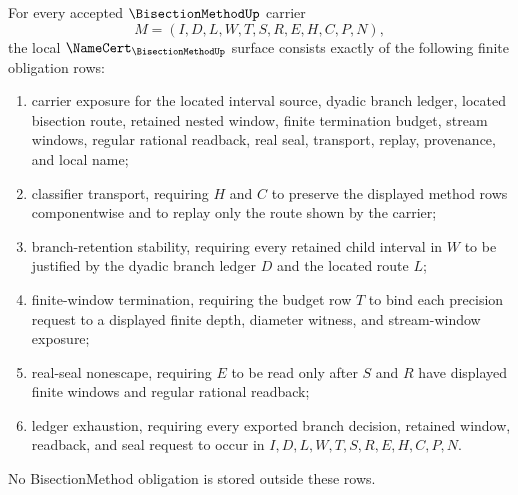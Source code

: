 \begin{theorem}
\label{thm:bisection-method-namecert-obligations}
For every accepted $\BisectionMethodUp$ carrier
$$
M=(I,D,L,W,T,S,R,E,H,C,P,N),
$$
the local $\NameCert_{\BisectionMethodUp}$ surface consists exactly of the following finite obligation rows:
\begin{enumerate}
\item carrier exposure for the located interval source, dyadic branch ledger, located bisection route, retained nested window, finite termination budget, stream windows, regular rational readback, real seal, transport, replay, provenance, and local name;
\item classifier transport, requiring $H$ and $C$ to preserve the displayed method rows componentwise and to replay only the route shown by the carrier;
\item branch-retention stability, requiring every retained child interval in $W$ to be justified by the dyadic branch ledger $D$ and the located route $L$;
\item finite-window termination, requiring the budget row $T$ to bind each precision request to a displayed finite depth, diameter witness, and stream-window exposure;
\item real-seal nonescape, requiring $E$ to be read only after $S$ and $R$ have displayed finite windows and regular rational readback;
\item ledger exhaustion, requiring every exported branch decision, retained window, readback, and seal request to occur in $I,D,L,W,T,S,R,E,H,C,P,N$.
\end{enumerate}
No BisectionMethod obligation is stored outside these rows.
\end{theorem}
